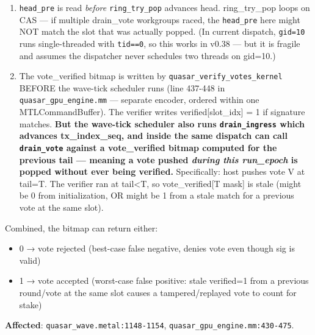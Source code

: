 \documentclass[
]{article}
\providecommand{\tightlist}{%
  \setlength{\itemsep}{0pt}\setlength{\parskip}{0pt}}
\begin{document}
\begin{enumerate}
\def\labelenumi{\arabic{enumi}.}
\tightlist
\item
  \texttt{head\_pre} is read \emph{before} \texttt{ring\_try\_pop}
  advances head. ring\_try\_pop loops on CAS --- if multiple drain\_vote
  workgroups raced, the \texttt{head\_pre} here might NOT match the slot
  that was actually popped. (In current dispatch, \texttt{gid=10} runs
  single-threaded with \texttt{tid==0}, so this works in v0.38 --- but
  it is fragile and assumes the dispatcher never schedules two threads
  on gid=10.)
\item
  The vote\_verified bitmap is written by
  \texttt{quasar\_verify\_votes\_kernel} BEFORE the wave-tick scheduler
  runs (line 437-448 in \texttt{quasar\_gpu\_engine.mm} --- separate
  encoder, ordered within one MTLCommandBuffer). The verifier writes
  verified{[}slot\_idx{]} = 1 if signature matches. \textbf{But the
  wave-tick scheduler also runs \texttt{drain\_ingress} which advances
  tx\_index\_seq, and inside the same dispatch can call
  \texttt{drain\_vote} against a vote\_verified bitmap computed for the
  previous tail --- meaning a vote pushed \emph{during this run\_epoch}
  is popped without ever being verified.} Specifically: host pushes vote
  V at tail=T. The verifier ran at tail\textless T, so
  vote\_verified{[}T mask{]} is stale (might be 0 from initialization,
  OR might be 1 from a stale match for a previous vote at the same
  slot).
\end{enumerate}

Combined, the bitmap can return either:

\begin{itemize}
\tightlist
\item
  0 → vote rejected (best-case false negative, denies vote even though
  sig is valid)
\item
  1 → vote accepted (worst-case false positive: stale verified=1 from a
  previous round/vote at the same slot causes a tampered/replayed vote
  to count for stake)
\end{itemize}

\textbf{Affected}: \texttt{quasar\_wave.metal:1148-1154},
\texttt{quasar\_gpu\_engine.mm:430-475}.
\end{document}
